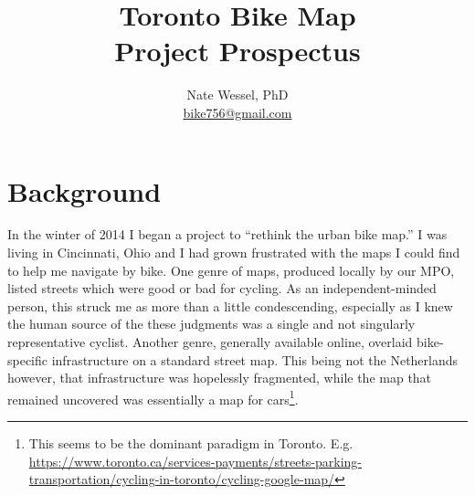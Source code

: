 \documentclass{article}
\title{Toronto Bike Map \\ Project Prospectus}
\author{Nate Wessel, PhD \\ \href{mailto:bike756@gmail.com}{bike756@gmail.com}}
\begin{document}
	\maketitle
	
	\section*{Background}
		In the winter of 2014 I began a project to ``rethink the urban bike map.''\cite{Wessel2015} 
		I was living in Cincinnati, Ohio and I had grown frustrated with the maps I could find to help me navigate by bike. One genre of maps, produced locally by our MPO, listed streets which were {\color{ForestGreen}good} or {\color{red}bad} for cycling. As an independent-minded person, this struck me as more than a little condescending, especially as I knew the human source of the these judgments was a single and not singularly representative cyclist.
		Another genre, generally available online, overlaid bike-specific infrastructure on a standard street map. This being not the Netherlands however, that infrastructure was hopelessly fragmented, while the map that remained uncovered was essentially a map for cars\footnote{This seems to be the dominant paradigm in Toronto. E.g. \href{https://www.toronto.ca/services-payments/streets-parking-transportation/cycling-in-toronto/cycling-google-map/}{https://www.toronto.ca/services-payments/streets-parking-transportation/cycling-in-toronto/cycling-google-map/}}.
	
\end{document}
